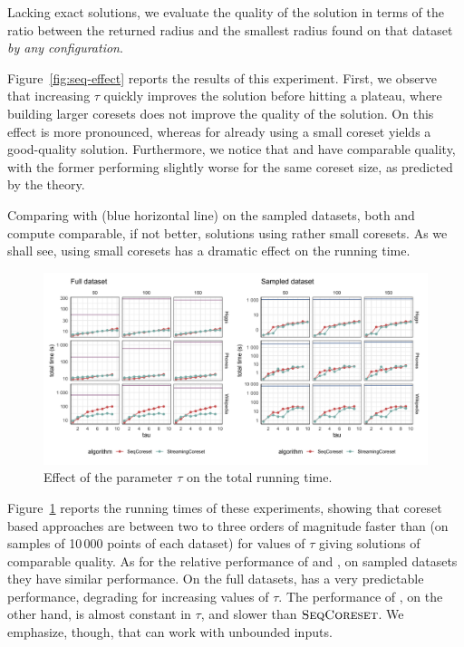 Lacking exact solutions,
we evaluate the quality of the solution in terms of the ratio between the returned radius
and the smallest radius found on that dataset \emph{by any configuration}.

Figure~\ref{fig:seq-effect} reports the results of this experiment.
First, we observe that increasing $\tau$ quickly improves the solution before hitting a plateau, where
building larger coresets does not improve the quality of the solution.
On \higgs this effect is more pronounced, whereas for \wiki already using a small coreset yields a good-quality solution.
Furthermore, we notice that \stream and \seq have comparable quality, with the former performing slightly 
worse for the same coreset size, as predicted by the theory.

Comparing with \chen (blue horizontal line) on the sampled datasets, both \seq and \stream compute comparable, 
if not better, solutions using rather small coresets.
As we shall see,
using small coresets has a dramatic effect on the running time.

\begin{figure}
    \includegraphics[width=\textwidth]{seq-time}
    \caption{
        \label{fig:seq-time}
        Effect of the parameter $\tau$ on the total running time.
    }
\end{figure}
Figure~\ref{fig:seq-time} reports the running times of these experiments,
showing that coreset based approaches are between two to three orders of magnitude faster than \chen
(on samples of 10\,000 points of each dataset) for values of $\tau$ giving solutions of comparable quality.
As for the relative performance of \seq and \stream, on sampled datasets they have similar performance.
On the full datasets, \seq has a very predictable performance, degrading for increasing values of $\tau$.
The performance of \stream, on the other hand, is almost constant in $\tau$, and slower than $\textsc{SeqCoreset}$.
We emphasize, though, that \stream can work with unbounded inputs.


